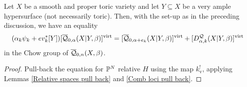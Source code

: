 \begin{thm} Let $X$ be a smooth and proper toric variety and let $Y \subseteq X$ be a very ample hypersurface (not necessarily toric). Then, with the set-up as in the preceding discussion, we have an equality
\begin{equation*} (\alpha_k \psi_k + ev_k^* [Y]) [\overline{\mathcal Q}_{0,\alpha}(X|Y,\beta)]^{\operatorname{virt}} = [\overline{\mathcal Q}_{0,\alpha+e_k}(X|Y,\beta)]^{\operatorname{virt}} + [D^\mathcal{Q}_{\alpha,k}(X|Y,\beta)]^{\operatorname{virt}} \end{equation*}
in the Chow group of $\overline{\mathcal Q}_{0,n}(X,\beta)$. \end{thm}
\begin{proof} Pull-back the equation for $\mathbb P^N$ relative $H$ using the map $k_{\text{v}}^!$, applying Lemmas \ref{Relative spaces pull back} and \ref{Comb loci pull back}. \end{proof}